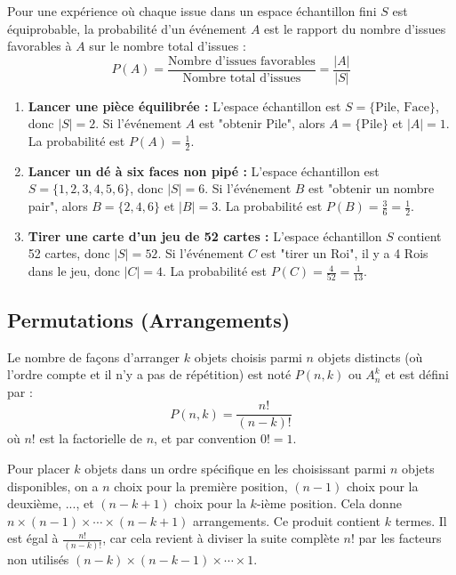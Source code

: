 \begin{definitionbox}
Pour une expérience où chaque issue dans un espace échantillon fini $S$ est équiprobable, la probabilité d'un événement $A$ est le rapport du nombre d'issues favorables à $A$ sur le nombre total d'issues :
$$ P(A) = \frac{\text{Nombre d'issues favorables}}{\text{Nombre total d'issues}} = \frac{|A|}{|S|} $$
\end{definitionbox}

\begin{examplebox}
\begin{enumerate}
    \item \textbf{Lancer une pièce équilibrée :}
    L'espace échantillon est $S = \{\text{Pile, Face}\}$, donc $|S| = 2$.
    Si l'événement $A$ est "obtenir Pile", alors $A = \{\text{Pile}\}$ et $|A| = 1$.
    La probabilité est $P(A) = \frac{1}{2}$.

    \item \textbf{Lancer un dé à six faces non pipé :}
    L'espace échantillon est $S = \{1, 2, 3, 4, 5, 6\}$, donc $|S| = 6$.
    Si l'événement $B$ est "obtenir un nombre pair", alors $B = \{2, 4, 6\}$ et $|B| = 3$.
    La probabilité est $P(B) = \frac{3}{6} = \frac{1}{2}$.

    \item \textbf{Tirer une carte d'un jeu de 52 cartes :}
    L'espace échantillon $S$ contient 52 cartes, donc $|S| = 52$.
    Si l'événement $C$ est "tirer un Roi", il y a 4 Rois dans le jeu, donc $|C| = 4$.
    La probabilité est $P(C) = \frac{4}{52} = \frac{1}{13}$.
\end{enumerate}
\end{examplebox}

\subsection{Permutations (Arrangements)}

\begin{definitionbox}
Le nombre de façons d'arranger $k$ objets choisis parmi $n$ objets distincts (où l'ordre compte et il n'y a pas de répétition) est noté $P(n, k)$ ou $A_n^k$ et est défini par :
$$ P(n, k) = \frac{n!}{(n-k)!} $$
où $n!$ est la factorielle de $n$, et par convention $0! = 1$.
\end{definitionbox}

\begin{intuitionbox}
Pour placer $k$ objets dans un ordre spécifique en les choisissant parmi $n$ objets disponibles, on a $n$ choix pour la première position, $(n-1)$ choix pour la deuxième, ..., et $(n-k+1)$ choix pour la $k$-ième position. Cela donne $n \times (n-1) \times \cdots \times (n-k+1)$ arrangements. Ce produit contient $k$ termes. Il est égal à $\frac{n!}{(n-k)!}$, car cela revient à diviser la suite complète $n!$ par les facteurs non utilisés $(n-k) \times (n-k-1) \times \cdots \times 1$.
\end{intuitionbox}

